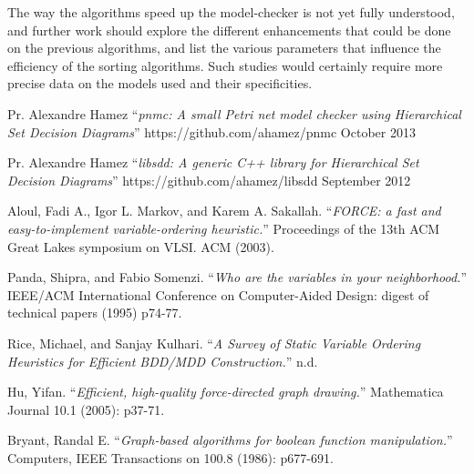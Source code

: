 \documentclass[12pt]{report}
\begin{document}
The way the algorithms speed up the model-checker is not yet fully understood, and further work should explore the different enhancements that could be done on the previous algorithms, and list the various parameters that influence the efficiency of the sorting algorithms. Such studies would certainly require more precise data on the models used and their specificities.

\begin{thebibliography}{1}

   Pr. Alexandre Hamez \enquote{\em pnmc: A small Petri net model checker using Hierarchical Set Decision Diagrams} https://github.com/ahamez/pnmc October 2013

   Pr. Alexandre Hamez \enquote{\em libsdd: A generic C++ library for Hierarchical Set Decision Diagrams} https://github.com/ahamez/libsdd September 2012

   Aloul, Fadi A., Igor L. Markov, and Karem A. Sakallah. \enquote{\em FORCE: a fast and easy-to-implement variable-ordering heuristic.} Proceedings of the 13th ACM Great Lakes symposium on VLSI. ACM (2003).

   Panda, Shipra, and Fabio Somenzi. \enquote{\em Who are the variables in your neighborhood.} IEEE/ACM International Conference on Computer-Aided Design: digest of technical papers (1995) p74-77.

   Rice, Michael, and Sanjay Kulhari. \enquote{\em A Survey of Static Variable Ordering Heuristics for Efficient BDD/MDD Construction.} n.d.

   Hu, Yifan. \enquote{\em Efficient, high-quality force-directed graph drawing.} Mathematica Journal 10.1 (2005): p37-71.

   Bryant, Randal E. \enquote{\em Graph-based algorithms for boolean function manipulation.} Computers, IEEE Transactions on 100.8 (1986): p677-691.

  \end{thebibliography}
\end{document}
